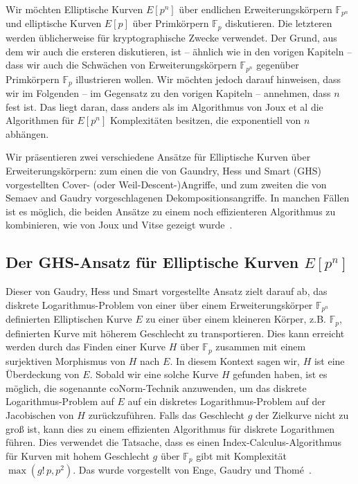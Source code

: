 \begin{refsegment}
Wir möchten Elliptische Kurven $E[p^n]$ über endlichen Erweiterungskörpern $\mathbb{F}_{p^n}$ und elliptische Kurven $E[p]$ über Primkörpern $\mathbb{F}_p$ diskutieren. Die letzteren werden üblicherweise für kryptographische Zwecke verwendet. Der Grund, aus dem wir auch die ersteren diskutieren, ist -- ähnlich wie in den vorigen Kapiteln -- dass wir auch die Schwächen von Erweiterungskörpern $\mathbb{F}_{p^n}$ gegenüber Primkörpern $\mathbb{F}_p$ illustrieren wollen. Wir möchten jedoch darauf hinweisen, dass wir im Folgenden -- im Gegensatz zu den vorigen Kapiteln -- annehmen, dass $n$ fest ist. Das liegt daran, dass anders als im Algorithmus von Joux et al die Algorithmen für $E[p^n]$ Komplexitäten besitzen, die exponentiell von $n$ abhängen.

Wir präsentieren zwei verschiedene Ansätze für Elliptische Kurven über Erweiterungskörpern: zum einen die von Gaundry, Hess und Smart (GHS) vorgestellten Cover- (oder Weil-Descent-)Angriffe, und zum zweiten die von Semaev and Gaudry vorgeschlagenen Dekompositionsangriffe. In manchen Fällen ist es möglich, die beiden Ansätze zu einem noch effizienteren Algorithmus zu kombinieren, wie von Joux und Vitse gezeigt wurde~\cite{JV2011}.


\subsection{\texorpdfstring{Der GHS-Ansatz für Elliptische Kurven $E[p^n]$}{Der GHS-Ansatz für Elliptische Kurven E[pn]}}
Dieser von Gaudry, Hess und Smart vorgestellte Ansatz zielt darauf ab, das diskrete
Logarith\-mus-Problem von einer über einem Erweiterungskörper $\mathbb{F}_{p^n}$ definierten Elliptischen Kurve $E$ zu einer über einem kleineren Körper, z.B. $\mathbb{F}_p$, definierten Kurve mit höherem Geschlecht zu transportieren. Dies kann erreicht werden durch das Finden einer Kurve $H$ über $\mathbb{F}_p$ zusammen mit einem surjektiven Morphismus von $H$ nach $E$. In diesem Kontext sagen wir, $H$ ist eine Überdeckung von $E$. Sobald wir eine solche Kurve $H$ gefunden haben, ist es möglich, die sogenannte coNorm-Technik anzuwenden, um das diskrete Logarithmus-Problem auf $E$ auf ein diskretes Logarithmus-Problem auf der Jacobischen von $H$ zurückzuführen. Falls das Geschlecht $g$ der Zielkurve nicht zu groß ist, kann dies zu einem effizienten Algorithmus für diskrete Logarithmen führen. Dies verwendet die Tatsache, dass es einen Index-Calculus-Algorithmus für Kurven mit hohem Geschlecht $g$ über $\mathbb{F}_p$ gibt mit Komplexität $\max(g!\, p, p^2)$. Das wurde vorgestellt von Enge, Gaudry und Thom\'e~\cite{EGT2011}.


\end{refsegment}
